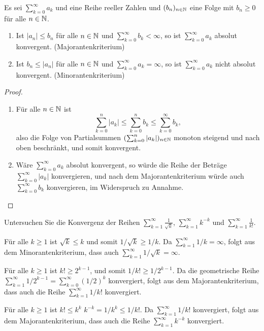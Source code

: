 \documentclass[a4paper,10pt]{article}
\begin{document}
\begin{lem}
 Es sei $\sum_{k=0}^\infty a_k$ und eine Reihe reeller Zahlen und $(b_n)_{n \in \mathbb{N}}$ eine Folge mit $b_n \geq 0$ für alle $n \in \mathbb{N}$.
 \begin{enumerate}
  \item
   Ist $|a_n| \leq b_n$ für alle $n \in \mathbb{N}$ und $\sum_{k=0}^\infty b_k < \infty$, so ist $\sum_{k=0}^\infty a_k$ absolut konvergent. (Majorantenkriterium)
  \item
   Ist $b_n \leq |a_n|$ für alle $n \in \mathbb{N}$ und $\sum_{k=0}^\infty a_k = \infty$, so ist $\sum_{k=0}^\infty a_k$ nicht absolut konvergent. (Minorantenkriterium)
 \end{enumerate}
\end{lem}
\begin{proof}
 \begin{enumerate}
  \item
   Für alle $n \in \mathbb{N}$ ist
   \[
    \sum_{k=0}^n |a_k| \leq \sum_{k=0}^n b_k \leq \sum_{k=0}^\infty b_k,
   \]
   also die Folge von Partialsummen $(\sum_{k=0}^n |a_k|)_{n \in \mathbb{N}}$ monoton steigend und nach oben beschränkt, und somit konvergent.
  \item
   Wäre $\sum_{k=0}^\infty a_k$ absolut konvergent, so würde die Reihe der Beträge $\sum_{k=0}^\infty |a_k|$ konvergieren, und nach dem Majorantenkriterium würde auch $\sum_{k=0}^\infty b_k$ konvergieren, im Widerspruch zu Annahme.
  \qedhere
 \end{enumerate}
\end{proof}


\begin{question}
 Untersuchen Sie die Konvergenz der Reihen $\sum_{k=1}^\infty \frac{1}{\sqrt{k}}$, $\sum_{k=1}^\infty k^{-k}$ und $\sum_{k=1}^\infty \frac{1}{k!}$.
\end{question}
\begin{solution}
 Für alle $k \geq 1$ ist $\sqrt{k} \leq k$ und somit $1/\sqrt{k} \geq 1/k$. Da $\sum_{k=1}^\infty 1/k = \infty$, folgt aus dem Minorantenkriterium, dass auch $\sum_{k=1}^\infty 1/\sqrt{k} = \infty$.
 
 Für alle $k \geq 1$ ist $k! \geq 2^{k-1}$, und somit $1/k! \geq 1/2^{k-1}$. Da die geometrische Reihe $\sum_{k=1}^\infty 1/2^{k-1} = \sum_{k=0}^\infty (1/2)^k$ konvergiert, folgt aus dem Majorantenkriterium, dass auch die Reihe $\sum_{k=1}^\infty 1/k!$ konvergiert.
 
 Für alle $k \geq 1$ ist $k! \leq k^k$ $k^{-k} = 1/k^k \leq 1/k!$. Da $\sum_{k=1}^\infty 1/k!$ konvergiert, folgt aus dem Majorantenkriterium, dass auch die Reihe $\sum_{k=1}^\infty k^{-k}$ konvergiert.
\end{solution}
\end{document}
